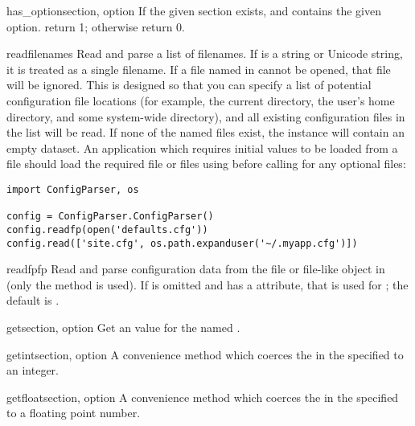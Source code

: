 \begin{methoddesc}{has_option}{section, option}
If the given section exists, and contains the given option. return 1;
otherwise return 0.
\end{methoddesc}

\begin{methoddesc}{read}{filenames}
Read and parse a list of filenames.  If  is a string or
Unicode string, it is treated as a single filename.
If a file named in  cannot be opened, that file will be
ignored.  This is designed so that you can specify a list of potential
configuration file locations (for example, the current directory, the
user's home directory, and some system-wide directory), and all
existing configuration files in the list will be read.  If none of the
named files exist, the  instance will contain an
empty dataset.  An application which requires initial values to be
loaded from a file should load the required file or files using
 before calling  for any optional
files:

\begin{verbatim}
import ConfigParser, os

config = ConfigParser.ConfigParser()
config.readfp(open('defaults.cfg'))
config.read(['site.cfg', os.path.expanduser('~/.myapp.cfg')])
\end{verbatim}
\end{methoddesc}

\begin{methoddesc}{readfp}{fp}
Read and parse configuration data from the file or file-like object in
 (only the  method is used).  If
 is omitted and  has a  attribute,
that is used for ; the default is .
\end{methoddesc}

\begin{methoddesc}{get}{section, option}
Get an  value for the named .
\end{methoddesc}

\begin{methoddesc}{getint}{section, option}
A convenience method which coerces the  in the specified
 to an integer.
\end{methoddesc}

\begin{methoddesc}{getfloat}{section, option}
A convenience method which coerces the  in the specified
 to a floating point number.
\end{methoddesc}

